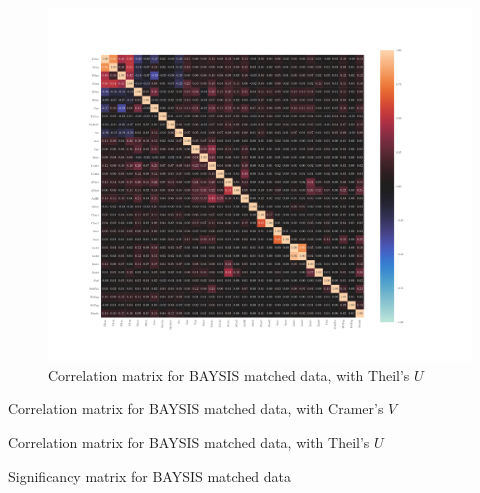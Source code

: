 \documentclass[a4paper,headsepline,footsepline,fontsize=11pt,BCOR=12mm,DIV=12]{report}
\begin{document}
\begin{appendices}
\label{appendix_baysis_dataset_corr_theils}
\begin{figure}[h]
	\centering
	\includegraphics[scale=0.52, trim=2cm 2cm 0cm 0cm]{../CorrAnalysis/data/BAYSIS/02_matched/plots/baysis_matched_corr_theils}
	\caption{Correlation matrix for BAYSIS matched data, with Theil's $U$}
	\label{img:appendix_correlation_matrix_matched_theils}
\end{figure}
\restoregeometry

\pagestyle{empty}

\begin{table}
	\tiny
	\setlength{\tabcolsep}{2pt}
	\centering
	
	\caption{Correlation matrix for BAYSIS matched data, with Cramer's $V$}
	\label{appendix_correlation_matrix_matched_cramers_table}
\end{table}

\begin{table}
	\tiny
	\setlength{\tabcolsep}{2pt}
	\centering
	
	\caption{Correlation matrix for BAYSIS matched data, with Theil's $U$}
	\label{appendix_correlation_matrix_matched_theils_table}
\end{table}

\begin{table}
	\fontsize{3}{5}\selectfont
	\setlength{\tabcolsep}{2pt}
	\centering
	
	\caption{Significancy matrix for BAYSIS matched data}
	\label{appendix_significancy_matrix_matched_table}
	\end{table}
\restoregeometry


\end{appendices}
\end{document}
